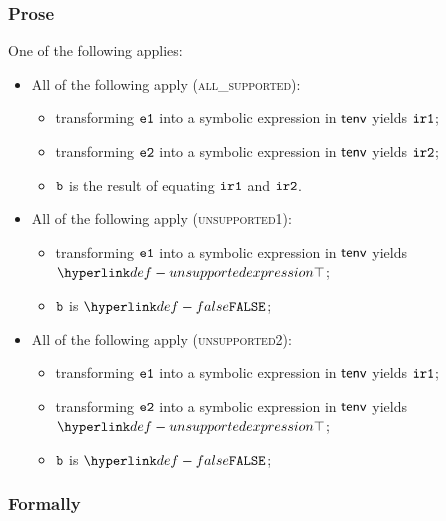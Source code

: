 \subsubsection{Prose}
One of the following applies:
\begin{itemize}
  \item All of the following apply (\textsc{all\_supported}):
  \begin{itemize}
    \item transforming $\texttt{e1}$ into a symbolic expression in $\textsf{tenv}$ yields $\texttt{ir1}$\ProseOrTypeError;
    \item transforming $\texttt{e2}$ into a symbolic expression in $\textsf{tenv}$ yields $\texttt{ir2}$\ProseOrTypeError;
    \item $\texttt{b}$ is the result of equating $\texttt{ir1}$ and $\texttt{ir2}$.
  \end{itemize}

  \item All of the following apply (\textsc{unsupported1}):
  \begin{itemize}
    \item transforming $\texttt{e1}$ into a symbolic expression in $\textsf{tenv}$ yields $\CannotBeTransformed$;
    \item $\texttt{b}$ is $\False$;
  \end{itemize}

  \item All of the following apply (\textsc{unsupported2}):
  \begin{itemize}
    \item transforming $\texttt{e1}$ into a symbolic expression in $\textsf{tenv}$ yields $\texttt{ir1}$;
    \item transforming $\texttt{e2}$ into a symbolic expression in $\textsf{tenv}$ yields $\CannotBeTransformed$;
    \item $\texttt{b}$ is $\False$;
  \end{itemize}
\end{itemize}

\subsubsection{Formally}

